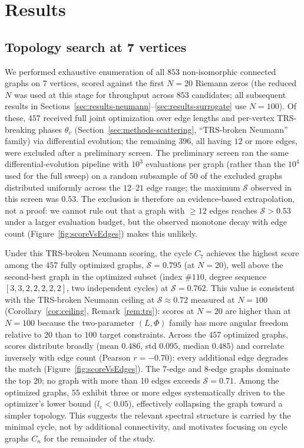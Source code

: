 \documentclass[cntp]{ipart}
\theoremstyle{plain}
\theoremstyle{remark}
\begin{document}
\section{Results}
\label{sec:results}

\subsection{Topology search at 7 vertices}
\label{sec:results-topology}

We performed exhaustive enumeration of all $853$ non-isomorphic connected graphs on $7$ vertices, scored against the first $N = 20$ Riemann zeros (the reduced $N$ was used at this stage for throughput across $853$ candidates; all subsequent results in Sections~\ref{sec:results-neumann}--\ref{sec:results-surrogate} use $N = 100$). Of these, $457$ received full joint optimization over edge lengths and per-vertex TRS-breaking phases $\theta_v$ (Section~\ref{sec:methods-scattering}, ``TRS-broken Neumann'' family) via differential evolution; the remaining $396$, all having $12$ or more edges, were excluded after a preliminary screen. The preliminary screen ran the same differential-evolution pipeline with $10^3$ evaluations per graph (rather than the $10^4$ used for the full sweep) on a random subsample of $50$ of the excluded graphs distributed uniformly across the $12$--$21$ edge range; the maximum $\mathcal{S}$ observed in this screen was $0.53$. The exclusion is therefore an evidence-based extrapolation, not a proof: we cannot rule out that a graph with $\geq 12$ edges reaches $\mathcal{S} > 0.53$ under a larger evaluation budget, but the observed monotone decay with edge count (Figure~\ref{fig:scoreVsEdges}) makes this unlikely.

Under this TRS-broken Neumann scoring, the cycle $C_7$ achieves the highest score among the $457$ fully optimized graphs, $\mathcal{S} = 0.795$ (at $N = 20$), well above the second-best graph in the optimized subset (index $\#110$, degree sequence $[3,3,2,2,2,2,2]$, two independent cycles) at $\mathcal{S} = 0.762$. This value is consistent with the TRS-broken Neumann ceiling at $\mathcal{S} \approx 0.72$ measured at $N = 100$ (Corollary~\ref{cor:ceiling}, Remark~\ref{rem:trs}): scores at $N = 20$ are higher than at $N = 100$ because the two-parameter $(L, \Phi)$ family has more angular freedom relative to $20$ than to $100$ target constraints. Across the $457$ optimized graphs, scores distribute broadly (mean $0.486$, std $0.095$, median $0.485$) and correlate inversely with edge count (Pearson $r = -0.70$): every additional edge degrades the match (Figure~\ref{fig:scoreVsEdges}). The 7-edge and 8-edge graphs dominate the top 20; no graph with more than 10 edges exceeds $\mathcal{S} = 0.71$. Among the optimized graphs, $55$ exhibit three or more edges systematically driven to the optimizer's lower bound ($l_e < 0.05$), effectively collapsing the graph toward a simpler topology. This suggests the relevant spectral structure is carried by the minimal cycle, not by additional connectivity, and motivates focusing on cycle graphs $C_n$ for the remainder of the study.
\end{document}
